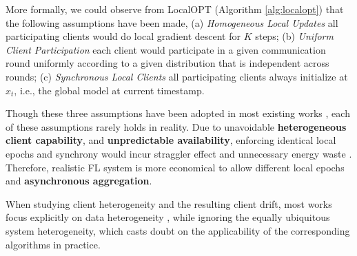 More formally, we could observe from LocalOPT (Algorithm \ref{alg:localopt}) that the following assumptions have been made, (a) \textit{Homogeneous Local Updates} all participating clients would do local gradient descent for $K$ steps; (b) \textit{Uniform Client Participation} each client would participate in a given communication round uniformly according to a given distribution that is independent across rounds; (c) \textit{Synchronous Local Clients} all participating clients always initialize at $x_t$, i.e., the global model at current timestamp. 



Though these three assumptions have been adopted in most existing works \citep{McMahan2017FedAvg,Hsu2019MeasuringTE,Li20FedProx,karimireddy2020scaffold,reddi2020adaptive,wang22adaptive}, each of these assumptions rarely holds in reality. Due to unavoidable \textbf{heterogeneous client capability}, and \textbf{unpredictable availability}, enforcing identical local epochs and synchrony would incur straggler effect and unnecessary energy waste \citep{Kairouz21AdvancesProblems}. Therefore, realistic FL system is more economical to allow different local epochs and \textbf{asynchronous aggregation}.


When studying client heterogeneity and the resulting client drift, most works focus explicitly on data heterogeneity \citep{Li2020Fed-Non-IID,yang2021achieving}, while ignoring the equally ubiquitous system heterogeneity, which casts doubt on the applicability of the corresponding algorithms in practice.


